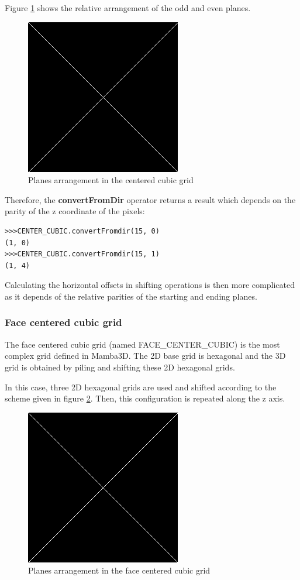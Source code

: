 \documentclass[a4paper,10pt,oneside]{article}
\begin{document}
Figure \ref{fig:CC_grid} shows the relative arrangement of the odd and even planes.

\begin{figure}
\centering
\includegraphics[scale=0.3]{figures/xxx.png}
\caption{Planes arrangement in the centered cubic grid}
\label{fig:CC_grid}
\end{figure}

Therefore, the \textbf{convertFromDir} operator returns a result which depends on the parity of the z coordinate of the pixels:

\lstset{language=Python}
\begin{lstlisting}
>>>CENTER_CUBIC.convertFromdir(15, 0)
(1, 0)
>>>CENTER_CUBIC.convertFromdir(15, 1)
(1, 4)
\end{lstlisting}

Calculating the horizontal offsets in shifting operations is then more complicated as it depends of the relative parities
of the starting and ending planes.

\subsubsection{Face centered cubic grid}
\label{FCCgrid}
The face centered cubic grid (named FACE\_CENTER\_CUBIC) is the most complex grid defined in Mamba3D. The 2D base grid is hexagonal
and the 3D grid is obtained by piling and shifting these 2D hexagonal grids.

In this case, three 2D hexagonal grids are used and shifted according to the scheme given in figure \ref{fig:FCC_grid}. Then, this configuration
is repeated along the z axis.

\begin{figure}
\centering
\includegraphics[scale=0.3]{figures/xxx.png}
\caption{Planes arrangement in the face centered cubic grid}
\label{fig:FCC_grid}
\end{figure}
\end{document}
